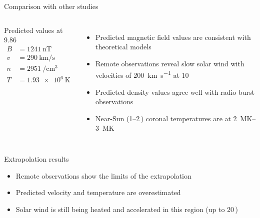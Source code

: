 \begin{frame}[plain,c]{Comparison with other studies}{}
	\begin{columns}[c]
		
		\begin{block}{\centering Predicted values at 9.86\,\Rs{}}
			\begin{align*}
				B &= \SI{1241}{\nano\tesla}\\
				v &= \SI{290}{\km\per\s}\\
				n &= \SI{2951}{\per\cm\cubed}\\
				T &= \SI{1.93e6}{\kelvin}
			\end{align*}
		\end{block}


		\begin{itemize}[<+->]
			\item Predicted magnetic field values are consistent with theoretical models \citep{Parker1958,Banaszkiewicz1998}
			\item Remote observations reveal slow solar wind with velocities of \SI{200}{\km\per\s} at 10\,\Rs{} \citep{Sheeley1997,Wang2000}
			\item Predicted density values agree well with radio burst observations \citep{Leblanc1998}
			\item Near-Sun (1--2\,\Rs) coronal temperatures are at \SIrange{2}{3}{\mega\kelvin} \citep{Billings1959,Liebenberg1975}
		\end{itemize}
	\end{columns}
	
	\vspace{2mm}
	
	\begin{columns}[c]
	\column<+->{\textwidth}
	
		\begin{block}{Extrapolation results \citep{Venzmer2018}}
			\begin{itemize}
				\item Remote observations show the limits of the extrapolation
				\item Predicted velocity and temperature are overestimated
				\item Solar wind is still being heated and accelerated in this region (up to 20\,\Rs{})
			\end{itemize}
		\end{block}
	
	\end{columns}
\end{frame}



